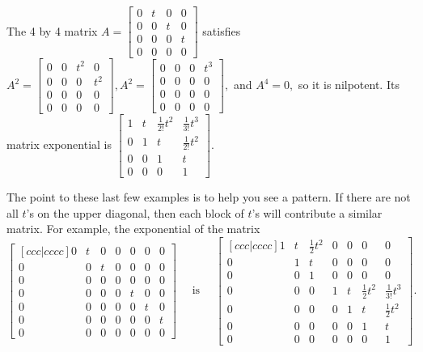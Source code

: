 The 4 by 4 matrix $A=
\begin{bmatrix}
 0 & t & 0 & 0 \\
 0 & 0 & t & 0 \\
 0 & 0 & 0 & t \\
 0 & 0 & 0 & 0
\end{bmatrix}
$ satisfies
$A^2 = 
\begin{bmatrix}
 0 & 0 & t^2 & 0 \\
 0 & 0 & 0 & t^2 \\
 0 & 0 & 0 & 0 \\
 0 & 0 & 0 & 0
\end{bmatrix}
,
A^2 = 
\begin{bmatrix}
 0 & 0 & 0 & t^3 \\
 0 & 0 & 0 & 0 \\
 0 & 0 & 0 & 0 \\
 0 & 0 & 0 & 0
\end{bmatrix}
,$ and
$A^4 = 0,$ so it is nilpotent. Its matrix exponential is
$
\begin{bmatrix}
 1 & t & \frac{1}{2!}t^2 & \frac{1}{3!}t^3 \\
 0 & 1 & t & \frac{1}{2!}t^2 \\
 0 & 0 & 1 & t \\
 0 & 0 & 0 & 1
\end{bmatrix}
$. 

The point to these last few examples is to help you see a pattern. If there are not all $t$'s on the upper diagonal, then each block of $t$'s will contribute a similar matrix.  For example, the exponential of the matrix 
$$
\begin{bmatrix}[ccc|cccc]
 0 & t & 0 & 0 & 0 & 0 & 0 \\
 0 & 0 & t & 0 & 0 & 0 & 0 \\
 0 & 0 & 0 & 0 & 0 & 0 & 0 \\\hline
 0 & 0 & 0 & 0 & t & 0 & 0 \\
 0 & 0 & 0 & 0 & 0 & t & 0 \\
 0 & 0 & 0 & 0 & 0 & 0 & t \\
 0 & 0 & 0 & 0 & 0 & 0 & 0
\end{bmatrix}
\quad\text{ is }
\quad
\begin{bmatrix}[ccc|cccc]
 1 & t & \frac{1}{2}t^2 & 0 & 0 & 0 & 0 \\
 0 & 1 & t & 0 & 0 & 0 & 0 \\
 0 & 0 & 1 & 0 & 0 & 0 & 0 \\\hline
 0 & 0 & 0 & 1 & t & \frac{1}{2}t^2 & \frac{1}{3!}t^3 \\
 0 & 0 & 0 & 0 & 1 & t & \frac{1}{2}t^2 \\
 0 & 0 & 0 & 0 & 0 & 1 & t \\
 0 & 0 & 0 & 0 & 0 & 0 & 1
\end{bmatrix}
.$$

